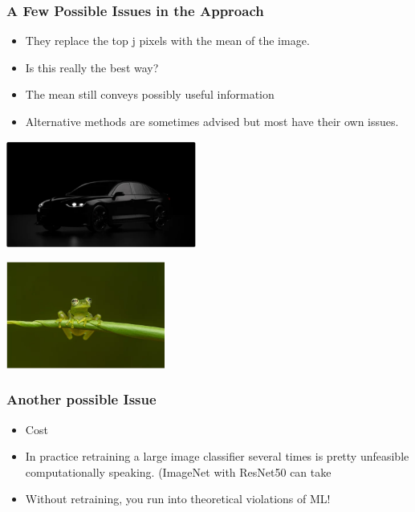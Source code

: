 \documentclass{beamer}
\theoremstyle{mystyle}
\begin{document}
\begin{frame}
    \frametitle{A Few Possible Issues in the Approach}
    \begin{itemize}
	\item They replace the top j pixels with the mean of the image.\pause
        \item Is this really the best way?\pause
        \item The mean still conveys possibly useful information \pause
        \item Alternative methods are sometimes advised but most have their own issues.
    \end{itemize}
    \begin{minipage}{0.48\textwidth}
        \centering
        \includegraphics[width=\textwidth, height=3.5cm]{black_car.png}
    \end{minipage}
    \hfill
    \begin{minipage}{0.48\textwidth}
        \centering
        \includegraphics[width=\textwidth, height=3.5cm]{green_frog2.png}
    \end{minipage}
\end{frame}
\begin{frame}
	\frametitle{Another possible Issue}
	\begin{itemize}
	\item Cost 
	\item In practice retraining a large image classifier several times is pretty unfeasible computationally speaking.  (ImageNet with ResNet50 can take 
	\item Without retraining, you run into theoretical violations of ML!
	\end{itemize}
\end{frame}
\end{document}
